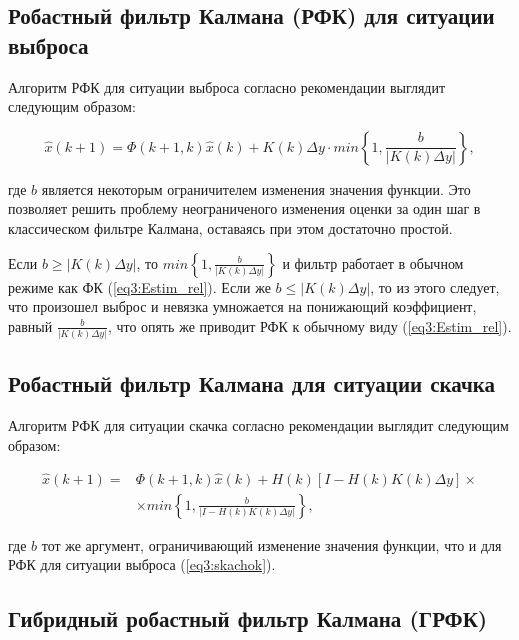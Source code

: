 \subsection{Робастный фильтр Калмана (РФК) для ситуации выброса} \label{sect3_5_1}

Алгоритм РФК для ситуации выброса согласно рекомендации \cite{RobustFilter} выглядит следующим образом:

\begin{equation}\label{eq3:skachok}
\hat{x}(k+1)=\Phi(k+1,k)\hat{x}(k)+K(k)\Delta y\cdot min\left\{1,\frac{b}{|K(k)\Delta y|}\right\},
\end{equation}

\noindent где $b$ является некоторым ограничителем изменения значения функции. 
Это позволяет решить проблему неограниченого изменения оценки за один шаг в классическом фильтре Калмана, оставаясь при этом достаточно простой.

Если $b\geq |K(k) \Delta y |$, то $min\left\{1,\frac{b}{|K(k)\Delta y|}\right\}$ и фильтр работает в обычном режиме как ФК (\ref{eq3:Estim_rel}). Если же $b\leq |K(k) \Delta y |$, то из этого следует, что произошел выброс и невязка умножается на понижающий коэффициент, равный $\frac{b}{|K(k)\Delta y|}$, что опять же приводит РФК к обычному виду (\ref{eq3:Estim_rel}).

\subsection{Робастный фильтр Калмана для ситуации скачка} \label{sect3_5_2}

Алгоритм РФК для ситуации скачка согласно рекомендации \cite{RobustFilter} выглядит следующим образом:

\begin{equation}\label{eq3:vibros}
\begin{split}
\hat{x}(k+1)=&\Phi(k+1,k)\hat{x}(k)+H(k)[I-H(k)K(k)\Delta y]\times \\
&\times min\left\{1,\frac{b}{|I-H(k)K(k)\Delta y|}\right\},
\end{split}
\end{equation}

\noindent где $b$ тот же аргумент, ограничивающий изменение значения функции, что и для РФК для ситуации выброса (\ref{eq3:skachok}).

\subsection{Гибридный робастный фильтр Калмана (ГРФК)} \label{sect3_5_3}

